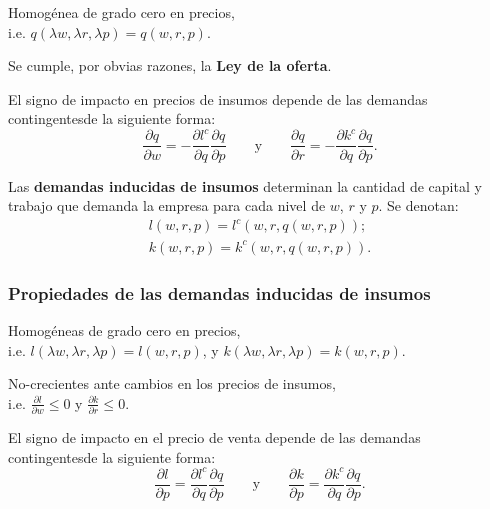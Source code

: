 \documentclass[8pt,a4paper]{extarticle}
\begin{document}
\begin{multicols}{3}
\begin{eqlist}
\item Homogénea de grado cero en precios, \\ i.e. $q(\lambda w, \lambda r, \lambda p) = q(w, r, p)$.
\item Se cumple, por obvias razones, la \textbf{Ley de la oferta}.
\item El signo de impacto en precios de insumos depende de las demandas contingentesde la siguiente forma:
	\[
		\frac{\partial q}{\partial w} = - \frac{\partial l^c}{\partial q} \frac{\partial q}{\partial p} \qquad \text{y} \qquad \frac{\partial q}{\partial r} = - \frac{\partial k^c}{\partial q} \frac{\partial q}{\partial p}
	.\] 
\end{eqlist}

\begin{boxdef}
	Las \textbf{demandas inducidas de insumos} determinan la cantidad de capital y trabajo que demanda la empresa para cada nivel de $w$, $r$ y $p$. Se denotan:
	\begin{gather*}
		l(w,r,p) = l^c (w, r, q(w, r, p)); \\
		k(w, r, p) = k^c(w, r, q(w, r, p))
	.\end{gather*}
\end{boxdef}

\sectionbreak

\subsubsection{Propiedades de las demandas inducidas de insumos}

\begin{eqlist}
\item Homogéneas de grado cero en precios,\\ i.e. $l(\lambda w, \lambda r, \lambda p) = l(w, r, p)$, y $k(\lambda w, \lambda r, \lambda p) = k(w, r, p)$.
\item No-crecientes ante cambios en los precios de insumos, \\ i.e. $\displaystyle \frac{\partial l}{\partial w} \le 0$ y $\displaystyle \frac{\partial k}{\partial r} \le 0$.
\item El signo de impacto en el precio de venta depende de las demandas contingentesde la siguiente forma:
	\[
		\frac{\partial l}{\partial p} = \frac{\partial l^c}{\partial q} \frac{\partial q}{\partial p} \qquad \text{y} \qquad \frac{\partial k}{\partial p} = \frac{\partial k^c}{\partial q} \frac{\partial q}{\partial p}
	.\] 
\end{eqlist}


\end{multicols}
\end{document}
